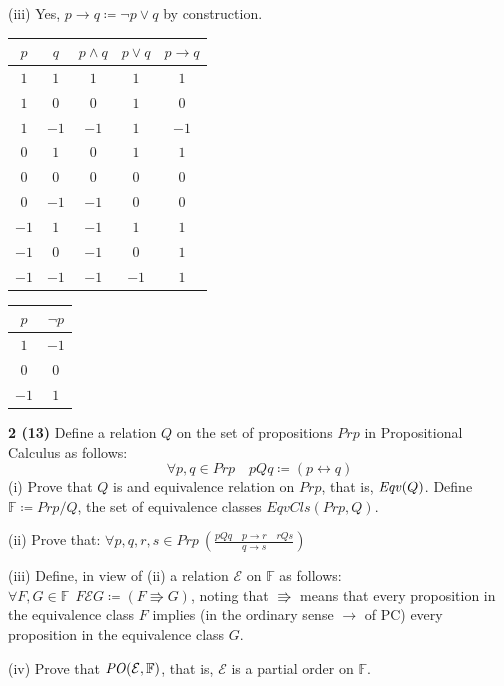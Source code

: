 \documentclass[11pt]{article}
\begin{document}
(iii) \quad Yes, $p\rightarrow q\coloneqq\neg p\vee q$ by construction.

\newpage
\thispagestyle{worksheet}

\begin{center}
\begin{tabular}{cc|c|c|c}
$p$&$q$&$p\wedge q$&$p\vee q$&$p\rightarrow q$\\\hline
$1$&$1$&$1$&$1$&$1$\\
$1$&$0$&$0$&$1$&$0$\\
$1$&$-1$&$-1$&$1$&$-1$\\
$0$&$1$&$0$&$1$&$1$\\
$0$&$0$&$0$&$0$&$0$\\
$0$&$-1$&$-1$&$0$&$0$\\
$-1$&$1$&$-1$&$1$&$1$\\
$-1$&$0$&$-1$&$0$&$1$\\
$-1$&$-1$&$-1$&$-1$&$1$\\
\end{tabular}
\qquad
\begin{tabular}{c|c}
$p$&$\neg p$\\\hline
$1$&$-1$\\
$0$&$0$\\
$-1$&$1$
\end{tabular}
\end{center}

\newpage
{}
\noindent\textbf{2 (13)} \quad Define a relation $Q$ on the set of propositions $Prp$ in Propositional Calculus as follows:
$$\forall p,q\in Prp\quad pQq\coloneqq(p\leftrightarrow q)$$
(i) Prove that $Q$ is and equivalence relation on $Prp$, that is, $\mathit{Eqv}(Q)$. Define $\mathbb F\coloneqq Prp/Q$, the set of equivalence classes $EqvCls(Prp,Q)$.

(ii) Prove that: $\displaystyle\forall p,q,r,s\in Prp\ \left(\frac{pQq\quad p\rightarrow r\quad rQs}{q\rightarrow s}\right)$

(iii) Define, in view of (ii) a relation $\mathcal E$ on $\mathbb F$ as follows: $\forall F,G\in\mathbb F\ \ F\mathcal EG\coloneqq(F\Rrightarrow G)$, noting that $\Rrightarrow$ means that every proposition in the equivalence class $F$ implies (in the ordinary sense $\rightarrow$ of PC) every proposition in the equivalence class $G$.

(iv) Prove that $\mathit{PO}(\mathcal E,\mathbb F)$, that is, $\mathcal E$ is a partial order on $\mathbb F$.
\end{document}
